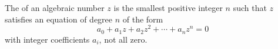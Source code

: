 The  of an algebraic number $z$ is the smallest positive integer $n$ such that $z$ satisfies an equation of degree $n$ of the form
$$a_0 + a_1 z + a_2 z^2 + \cdots + a_n z^n = 0$$
with integer coefficients $a_i$, not all zero.
